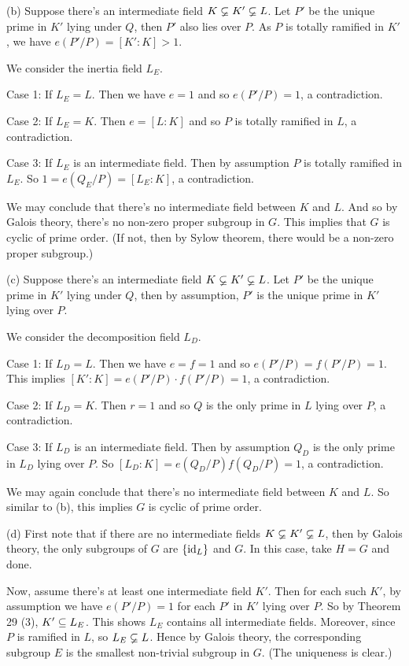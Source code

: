 \documentclass[../Marcus.tex]{subfiles}
\begin{document}
(b) Suppose there's an intermediate field $K\varsubsetneq K'\varsubsetneq L$. Let $P'$ be the unique prime in $K'$ lying under $Q$, then $P'$ also lies over $P$. As $P$ is totally ramified in $K'$, we have $e(P'/P)=[K':K]>1$.

We consider the inertia field $L_E$.

Case 1: If $L_E=L$. Then we have $e=1$ and so $e(P'/P)=1$, a contradiction.

Case 2: If $L_E=K$. Then $e=[L:K]$ and so $P$ is totally ramified in $L$, a contradiction.

Case 3: If $L_E$ is an intermediate field. Then by assumption $P$ is totally ramified in $L_E$. So $1=e(Q_E/P)=[L_E:K]$, a contradiction. 

We may conclude that there's no intermediate field between $K$ and $L$. And so by Galois theory, there's no non-zero proper subgroup in $G$. This implies that $G$ is cyclic of prime order. (If not, then by Sylow theorem, there would be a non-zero proper subgroup.)

(c) Suppose there's an intermediate field $K\varsubsetneq K'\varsubsetneq L$. Let $P'$ be the unique prime in $K'$ lying under $Q$, then by assumption, $P'$ is the unique prime in $K'$ lying over $P$.

We consider the decomposition field $L_D$.

Case 1: If $L_D=L$. Then we have $e=f=1$ and so $e(P'/P)=f(P'/P)=1$. This implies $[K':K] = e(P'/P) \cdot f(P'/P) = 1$, a contradiction.

Case 2: If $L_D=K$. Then $r=1$ and so $Q$ is the only prime in $L$ lying over $P$, a contradiction.

Case 3: If $L_D$ is an intermediate field. Then by assumption $Q_D$ is the only prime in $L_D$ lying over $P$. So $[L_D:K]=e(Q_D/P)f(Q_D/P)=1$, a contradiction.

We may again conclude that there's no intermediate field between $K$ and $L$. So similar to (b), this implies $G$ is cyclic of prime order.

(d) First note that if there are no intermediate fields $K\varsubsetneq K'\varsubsetneq L$, then by Galois theory, the only subgroups of $G$ are $\{\operatorname{id}_L\}$ and $G$. In this case, take $H=G$ and done.

Now, assume there's at least one intermediate field $K'$. Then for each such $K'$, by assumption we have $e(P'/P)=1$ for each $P'$ in $K'$ lying over $P$. So by Theorem 29 (3), $K'\subseteq L_E$. This shows $L_E$ contains all intermediate fields. Moreover, since $P$ is ramified in $L$, so $L_E\varsubsetneq L$. Hence by Galois theory, the corresponding subgroup $E$ is the smallest non-trivial subgroup in $G$. (The uniqueness is clear.)
\end{document}
